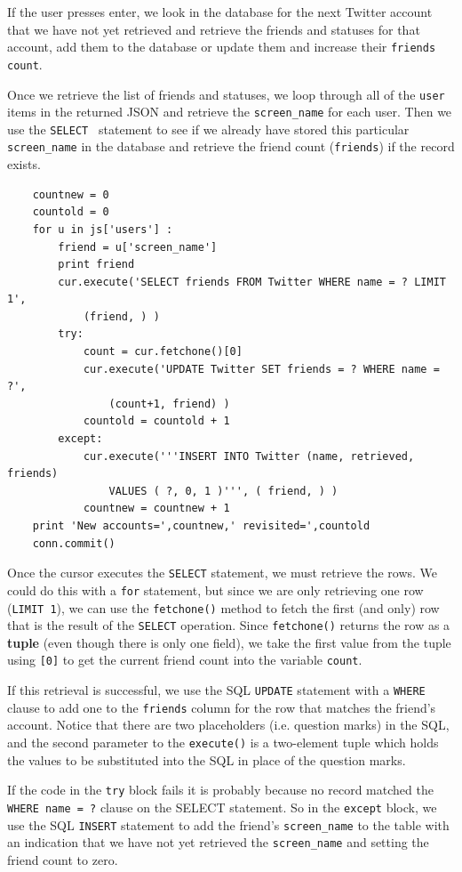 \documentclass[11pt]{book}
\begin{document}
If the user presses enter, we look in the database for the next 
Twitter account that we have not yet retrieved and retrieve the
friends and statuses for that account, add them to the database 
or update them and increase their {\tt friends count}.

Once we retrieve the list of friends and statuses, we loop 
through all of the {\tt user} items in the returned JSON
and retrieve the \verb"screen_name" for each user.  Then we use
the {\tt SELECT } statement to see if we already have stored this
particular \verb"screen_name" in the database and retrieve the
friend count ({\tt friends}) if the record exists.

\beforeverb
\begin{verbatim}
    countnew = 0
    countold = 0
    for u in js['users'] :
        friend = u['screen_name']
        print friend
        cur.execute('SELECT friends FROM Twitter WHERE name = ? LIMIT 1', 
            (friend, ) )
        try:
            count = cur.fetchone()[0]
            cur.execute('UPDATE Twitter SET friends = ? WHERE name = ?', 
                (count+1, friend) )
            countold = countold + 1
        except:
            cur.execute('''INSERT INTO Twitter (name, retrieved, friends) 
                VALUES ( ?, 0, 1 )''', ( friend, ) )
            countnew = countnew + 1
    print 'New accounts=',countnew,' revisited=',countold
    conn.commit()
\end{verbatim}
\afterverb
%
Once the cursor executes the {\tt SELECT} statement, 
we must retrieve the rows.  We could do this with a {\tt for} 
statement, but since we are only retrieving
one row ({\tt LIMIT 1}), we can use the {\tt fetchone()} method to fetch the
first (and only) row that is the result of the {\tt SELECT} operation.  
Since {\tt fetchone()} returns the row as a {\bf tuple} (even though there is only
one field), we take the first value from the tuple using {\tt [0]} to get the 
current friend count into the variable {\tt count}.  

If this retrieval is successful, we use the SQL {\tt UPDATE} statement with a 
{\tt WHERE} clause to add one to the {\tt friends} column for the row that 
matches the friend's account.  Notice that there are two placeholders (i.e.
question marks) in the SQL, and the second parameter to the {\tt execute()} is
a two-element tuple which holds the values to be substituted into the SQL
in place of the question marks.

If the code in the {\tt try} block fails it is probably because no record
matched the {\tt WHERE name = ?} clause on the SELECT statement.  So in the
{\tt except} block, we use the SQL {\tt INSERT} statement to add the friend's
\verb"screen_name" to the table with an indication that we have not yet 
retrieved the \verb"screen_name" and setting the friend count to zero.
\end{document}
